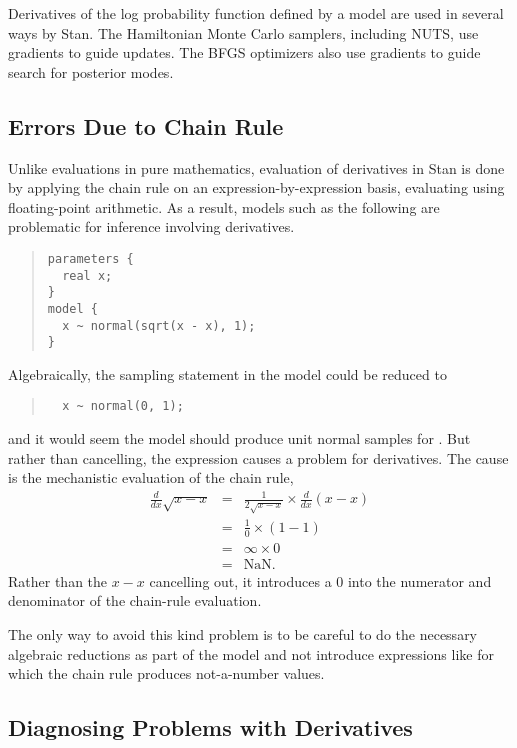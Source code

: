 Derivatives of the log probability function defined by a model are
used in several ways by Stan.  The Hamiltonian Monte Carlo samplers,
including NUTS, use gradients to guide updates.  The BFGS optimizers
also use gradients to guide search for posterior modes.  

\subsection{Errors Due to Chain Rule}

Unlike evaluations in pure mathematics, evaluation of derivatives in
Stan is done by applying the chain rule on an expression-by-expression
basis, evaluating using floating-point arithmetic.  As a result,
models such as the following are problematic for inference involving
derivatives.
%
\begin{quote}
\begin{Verbatim}
parameters {
  real x;
}
model {
  x ~ normal(sqrt(x - x), 1);
}
\end{Verbatim}
\end{quote}
%
Algebraically, the sampling statement in the model could be reduced to
%
\begin{quote}
\begin{Verbatim}
  x ~ normal(0, 1);
\end{Verbatim}
\end{quote}
%
and it would seem the model should produce unit normal samples for
.  But rather than cancelling, the expression  causes a problem for derivatives.  The cause is the mechanistic
evaluation of the chain rule, 
%
\begin{eqnarray*}
\frac{d}{dx} \sqrt{x - x}
& = &
\frac{1}{2 \sqrt{x - x}} \times \frac{d}{dx} (x - x)
\\[4pt]
& = & 
\frac{1}{0} \times (1 - 1)
\\[4pt]
& = & 
\infty \times 0
\\[4pt]
& = & \mbox{NaN}.
\end{eqnarray*}
%
Rather than the $x - x$ cancelling out, it introduces a 0 into the
numerator and denominator of the chain-rule evaluation.

The only way to avoid this kind problem is to be careful to do the
necessary algebraic reductions as part of the model and not introduce
expressions like  for which the chain rule produces
not-a-number values.  

\subsection{Diagnosing Problems with Derivatives}

